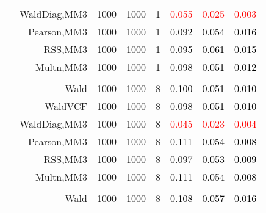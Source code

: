 \documentclass[
]{article}
\begin{document}
\begin{table}[H]
{\begin{tabular}[t]{lrrrrrrr}
\hspace{1em} & WaldDiag,MM3 & 1000 & 1000 & 1 & \textcolor{red}{0.055} & \textcolor{red}{0.025} & \textcolor{red}{0.003}\\

\hspace{1em} & Pearson,MM3 & 1000 & 1000 & 1 & \textcolor{black}{0.092} & \textcolor{black}{0.054} & \textcolor{black}{0.016}\\

\hspace{1em} & RSS,MM3 & 1000 & 1000 & 1 & \textcolor{black}{0.095} & \textcolor{black}{0.061} & \textcolor{black}{0.015}\\

\hspace{1em} & Multn,MM3 & 1000 & 1000 & 1 & \textcolor{black}{0.098} & \textcolor{black}{0.051} & \textcolor{black}{0.012}\\
\cmidrule{1-8}
\addlinespace[0.3em]
\multicolumn{8}{l}{\textbf{1F 15V}}\\
\hspace{1em} & Wald & 1000 & 1000 & 8 & \textcolor{black}{0.100} & \textcolor{black}{0.051} & \textcolor{black}{0.010}\\

\hspace{1em} & WaldVCF & 1000 & 1000 & 8 & \textcolor{black}{0.098} & \textcolor{black}{0.051} & \textcolor{black}{0.010}\\

\hspace{1em} & WaldDiag,MM3 & 1000 & 1000 & 8 & \textcolor{red}{0.045} & \textcolor{red}{0.023} & \textcolor{red}{0.004}\\

\hspace{1em} & Pearson,MM3 & 1000 & 1000 & 8 & \textcolor{black}{0.111} & \textcolor{black}{0.054} & \textcolor{black}{0.008}\\

\hspace{1em} & RSS,MM3 & 1000 & 1000 & 8 & \textcolor{black}{0.097} & \textcolor{black}{0.053} & \textcolor{black}{0.009}\\

\hspace{1em} & Multn,MM3 & 1000 & 1000 & 8 & \textcolor{black}{0.111} & \textcolor{black}{0.054} & \textcolor{black}{0.008}\\
\cmidrule{1-8}
\addlinespace[0.3em]
\multicolumn{8}{l}{\textbf{2F 10V}}\\
\hspace{1em} & Wald & 1000 & 1000 & 8 & \textcolor{black}{0.108} & \textcolor{black}{0.057} & \textcolor{black}{0.016}\\


\end{tabular}}
\end{table}
\end{document}
